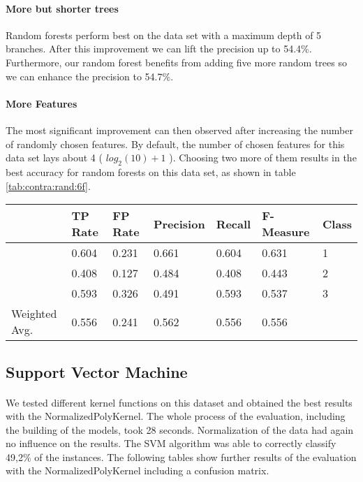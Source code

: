 \documentclass[paper=a4, fontsize=11pt]{scrartcl} %
\numberwithin{equation}{section} %
\numberwithin{figure}{section} %
\numberwithin{table}{section} %
\begin{document}
\paragraph{More but shorter trees}
Random forests perform best on the data set with a maximum depth of 5 branches. After this improvement we can lift the precision up to 54.4\%. Furthermore, our random forest benefits from adding five more random trees so we can enhance the precision to  54.7\%.
\paragraph{More Features}
The most significant improvement can then observed after increasing the number of randomly chosen features. By default, the number of chosen features for this data set lays about 4 ( $ log_2(10) + 1 $ ). Choosing two more of them results in the best accuracy for random forests on this data set, as shown in table \ref{tab:contra:rand:6f}.

\begin{table*}[htb]\centering
  \begin{tabular*}{\columnwidth}{@{}lllllll@{}}
      \toprule 
               &  TP Rate & FP Rate & Precision & Recall & F-Measure &  Class \\  \midrule     
               &  0.604   & 0.231   & 0.661     & 0.604  & 0.631     &  1     \\  
               &  0.408   & 0.127   & 0.484     & 0.408  & 0.443     &  2     \\  
               &  0.593   & 0.326   & 0.491     & 0.593  & 0.537     &  3     \\  
Weighted Avg.  &  0.556   & 0.241   & 0.562     & 0.556  & 0.556     &        \\  \bottomrule 
    \end{tabular*}
\caption{Random Forests on Contraceptive Data Set -- with at least 6 chosen features} 
\label{tab:contra:rand:6f}
\end{table*}
\FloatBarrier




\subsection{Support Vector Machine}

\paragraph{}We tested different kernel functions on this dataset and obtained the best results with the NormalizedPolyKernel. The whole process of the evaluation, including the building of the models, took 28 seconds. Normalization of the data had again no influence on the results. The SVM algorithm was able to correctly classify 49,2\% of the instances. The following tables show further results of the evaluation with the NormalizedPolyKernel including a confusion matrix.
\end{document}
